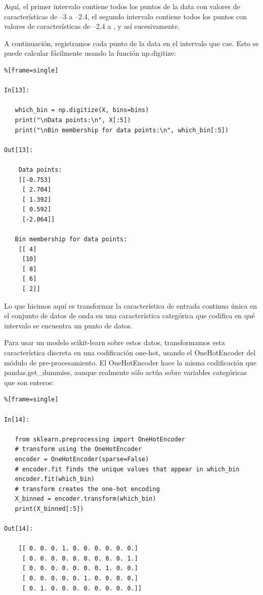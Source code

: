 Aquí, el primer intervalo contiene todos los puntos de la  data con valores de características de
  \:  –3 \:    a  \:  –2.4, el segundo intervalo contiene todos los puntos con valores de características de \: –2,4 \: a ,  y  así sucesivamente.


A continuación, registramos  cada punto de la  data en el intervalo que cae. Esto se puede calcular fácilmente usando la función {\ttfamily np.digitize}: \\


\begin{lstlisting}%[frame=single]

In[13]:

   which_bin = np.digitize(X, bins=bins)
   print("\nData points:\n", X[:5])
   print("\nBin membership for data points:\n", which_bin[:5])

Out[13]:

    Data points:
    [[-0.753]
     [ 2.704]
     [ 1.392]
     [ 0.592]
     [-2.064]]

   Bin membership for data points:
    [[ 4]
     [10]
     [ 8]
     [ 6]
     [ 2]]

\end{lstlisting}

	
Lo que hicimos aquí es transformar la característica de entrada continua única en el conjunto de datos de onda en una característica categórica que codifica en qué intervalo se encuentra un punto de datos. 

Para usar un modelo {\ttfamily scikit-learn }  sobre estos datos, transformamos esta característica discreta en una codificación one-hot,	usando el {\ttfamily OneHotEncoder} del módulo de pre-procesamiento. El {\ttfamily OneHotEncoder}  hace 	la misma codificación que {\ttfamily pandas.get\_dummies}, aunque realmente sólo actúa  sobre  variables categóricas que son enteros:\\

\begin{lstlisting}%[frame=single]

In[14]:

   from sklearn.preprocessing import OneHotEncoder
   # transform using the OneHotEncoder
   encoder = OneHotEncoder(sparse=False)
   # encoder.fit finds the unique values that appear in which_bin
   encoder.fit(which_bin)
   # transform creates the one-hot encoding
   X_binned = encoder.transform(which_bin)
   print(X_binned[:5])

Out[14]:

    [[ 0. 0. 0. 1. 0. 0. 0. 0. 0. 0.]
     [ 0. 0. 0. 0. 0. 0. 0. 0. 0. 1.]
     [ 0. 0. 0. 0. 0. 0. 0. 1. 0. 0.]
     [ 0. 0. 0. 0. 0. 1. 0. 0. 0. 0.]
     [ 0. 1. 0. 0. 0. 0. 0. 0. 0. 0.]]



\end{lstlisting}

